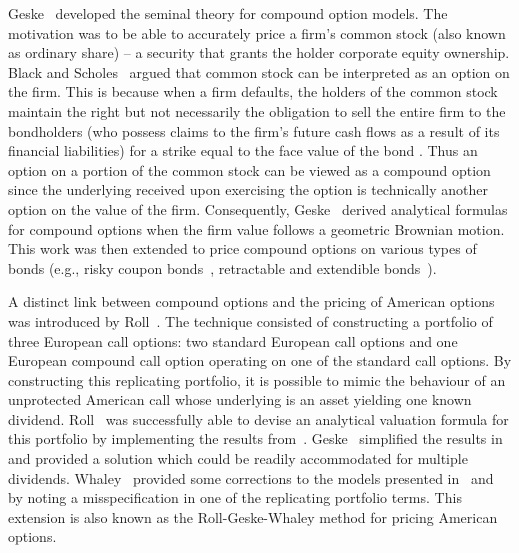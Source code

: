 Geske~\cite{Geske1979} developed the seminal theory for compound option models. The motivation was to be able to accurately price a firm's common stock (also known as ordinary share) -- a security that grants the holder corporate equity ownership. Black and Scholes~\cite{Black1973} argued that common stock can be interpreted as an option on the firm. This is because when a firm defaults, the holders of the common stock maintain the right but not necessarily the obligation to sell the entire firm to the bondholders (who possess claims to the firm's future cash flows as a result of its financial liabilities) for a strike equal to the face value of the bond \cite{Kwok2008}. Thus an option on a portion of the common stock can be viewed as a compound option since the underlying received upon exercising the option is technically another option on the value of the firm. Consequently, Geske~\cite{Geske1979} derived analytical formulas for compound options when the firm value follows a geometric Brownian motion. This work was then extended to price compound options on various types of bonds (e.g., risky coupon bonds~\cite{Geske1977}, retractable and extendible bonds~\cite{Brennan1977, Ananthanarayanan1980, Longstaff1990}).

A distinct link between compound options and the pricing of American options was introduced by Roll~\cite{Roll1977}. The technique consisted of constructing a portfolio of three European call options: two standard European call options and one European compound call option operating on one of the standard call options. By constructing this replicating portfolio, it is possible to mimic the behaviour of an unprotected American call whose underlying is an asset yielding one known dividend. Roll~\cite{Roll1977} was successfully able to devise an analytical valuation formula for this portfolio by implementing the results from~\cite{Geske1979}. Geske~\cite{Geske1979b} simplified the results in~\cite{Roll1977} and provided a solution which could be readily accommodated for multiple dividends. Whaley~\cite{Whaley1982} provided some corrections to the models presented in~\cite{Roll1977} and~\cite{Geske1979} by noting a misspecification in one of the replicating portfolio terms. This extension is also known as the Roll-Geske-Whaley method for pricing American options.

